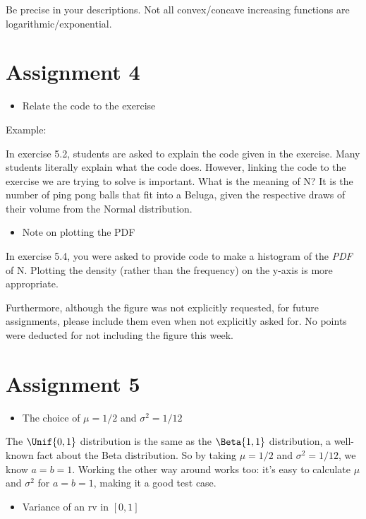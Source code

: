 Be precise in your descriptions. Not all convex/concave increasing
functions are logarithmic/exponential.

\section*{Assignment 4}

\begin{itemize}
\item Relate the code to the exercise
\end{itemize}

Example:

In exercise 5.2, students are asked to explain the code given in the
exercise. Many students literally explain what the code does. However,
linking the code to the exercise we are trying to solve is important.
What is the meaning of N? It is the number of ping pong balls that fit
into a Beluga, given the respective draws of their volume from the
Normal distribution.

\begin{itemize}
\item Note on plotting the PDF 
\end{itemize}

In exercise 5.4, you were asked to provide code to make a histogram of
the \emph{PDF} of N. Plotting the density (rather than the frequency)
on the y-axis is more appropriate.

Furthermore, although the figure was not explicitly requested, for
future assignments, please include them even when not explicitly asked
for. No points were deducted for not including the figure this week.

\section*{Assignment 5}

\begin{itemize}
\item The choice of $\mu = 1/2$ and $\sigma^2 = 1/12$
\end{itemize}

The $\Unif{0,1}$ distribution is the same as the $\Beta{1,1}$
distribution, a well-known fact about the Beta distribution. So by
taking $\mu = 1/2$ and $\sigma^2 = 1/12$, we know $a=b=1$. Working the
other way around works too: it's easy to calculate $\mu$ and
$\sigma^2$ for $a=b=1$, making it a good test case.

\begin{itemize}
\item Variance of an rv in $[0,1]$
\end{itemize}

